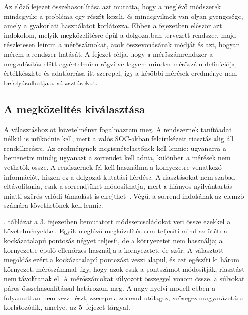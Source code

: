 Az előző fejezet összehasonlítása azt mutatta, hogy a meglévő módszerek mindegyike a probléma egy részét kezeli, és mindegyiknek van olyan gyengesége, amely a gyakorlati használatot korlátozza. Ebben a fejezetben először azt indokolom, melyik megközelítésre épül a dolgozatban tervezett rendszer, majd részletesen leírom a mérőszámokat, azok összevonásának módját és azt, hogyan mérem a rendszer hatását. A fejezet célja, hogy a mérőszámrendszer a megvalósítás előtt egyértelműen rögzítve legyen: minden mérőszám definíciója, értékkészlete és adatforrása itt szerepel, így a későbbi mérések eredménye nem befolyásolhatja a választásokat.

\subsection{A megközelítés kiválasztása}\label{sec:valasztas}
A választáshoz öt követelményt fogalmaztam meg. A rendszernek tanítóadat nélkül is működnie kell, mert a valós \ac{SOC}-okban felcímkézett riasztás alig áll rendelkezésre. Az eredménynek megismételhetőnek kell lennie: ugyanarra a bemenetre mindig ugyanazt a sorrendet kell adnia, különben a mérések nem vethetők össze. A rendszernek fel kell használnia a környezetre vonatkozó információt, hiszen ez a dolgozat kutatási kérdése. A riasztásokat nem szabad eltávolítania, csak a sorrendjüket módosíthatja, mert a hiányos nyilvántartás miatti szűrés valódi támadást is elrejthet~\cite{sommestad2015}. Végül a sorrend indokának az elemző számára követhetőnek kell lennie.

\Az{\ref{tab:valasztas}}. táblázat a 3. fejezetben bemutatott módszercsaládokat veti össze ezekkel a követelményekkel. Egyik meglévő megközelítés sem teljesíti mind az ötöt: a kockázatalapú pontozás négyet teljesít, de a környezetet nem használja; a környezetre épülő ellenőrzés használja a környezetet, de szűr. A választott megoldás ezért a kockázatalapú pontozást veszi alapul, és azt egészíti ki három környezeti mérőszámmal úgy, hogy azok csak a pontszámot módosítják, riasztást nem távolítanak el. A mérőszámokat súlyozott összeggel vonom össze, a súlyokat páros összehasonlítással határozom meg. A nagy nyelvi modell ebben a folyamatban nem vesz részt; szerepe a sorrend utólagos, szöveges magyarázatára korlátozódik, amelyet az 5. fejezet tárgyal.

